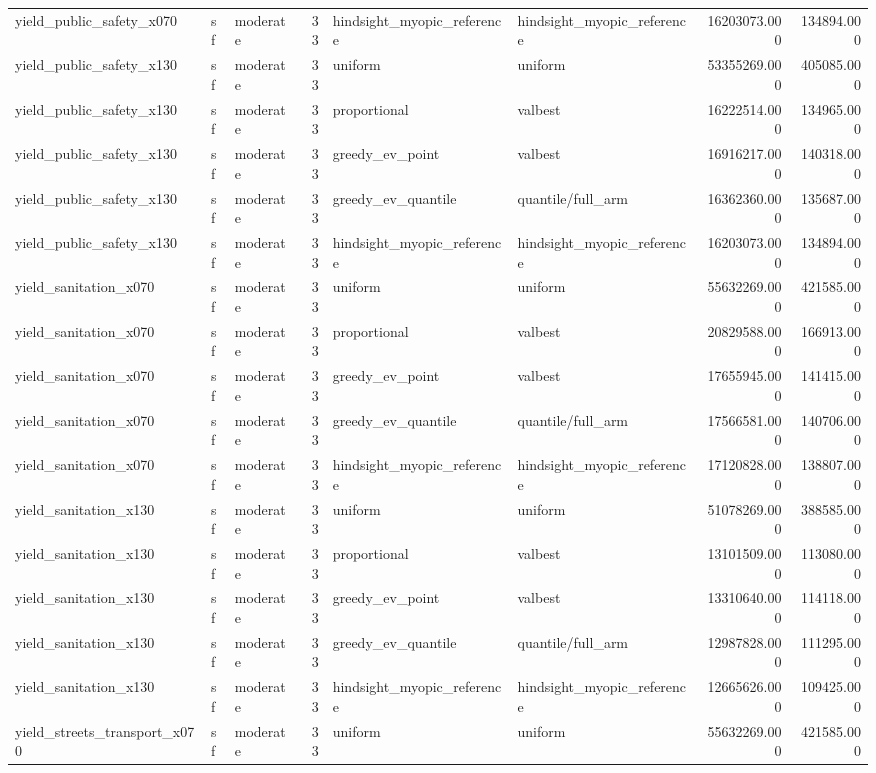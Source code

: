 \begin{tabular}{lllrllrr}
yield\_public\_safety\_x070 & sf & moderate & 33 & hindsight\_myopic\_reference & hindsight\_myopic\_reference & 16203073.000 & 134894.000 \\
yield\_public\_safety\_x130 & sf & moderate & 33 & uniform & uniform & 53355269.000 & 405085.000 \\
yield\_public\_safety\_x130 & sf & moderate & 33 & proportional & valbest & 16222514.000 & 134965.000 \\
yield\_public\_safety\_x130 & sf & moderate & 33 & greedy\_ev\_point & valbest & 16916217.000 & 140318.000 \\
yield\_public\_safety\_x130 & sf & moderate & 33 & greedy\_ev\_quantile & quantile/full\_arm & 16362360.000 & 135687.000 \\
yield\_public\_safety\_x130 & sf & moderate & 33 & hindsight\_myopic\_reference & hindsight\_myopic\_reference & 16203073.000 & 134894.000 \\
yield\_sanitation\_x070 & sf & moderate & 33 & uniform & uniform & 55632269.000 & 421585.000 \\
yield\_sanitation\_x070 & sf & moderate & 33 & proportional & valbest & 20829588.000 & 166913.000 \\
yield\_sanitation\_x070 & sf & moderate & 33 & greedy\_ev\_point & valbest & 17655945.000 & 141415.000 \\
yield\_sanitation\_x070 & sf & moderate & 33 & greedy\_ev\_quantile & quantile/full\_arm & 17566581.000 & 140706.000 \\
yield\_sanitation\_x070 & sf & moderate & 33 & hindsight\_myopic\_reference & hindsight\_myopic\_reference & 17120828.000 & 138807.000 \\
yield\_sanitation\_x130 & sf & moderate & 33 & uniform & uniform & 51078269.000 & 388585.000 \\
yield\_sanitation\_x130 & sf & moderate & 33 & proportional & valbest & 13101509.000 & 113080.000 \\
yield\_sanitation\_x130 & sf & moderate & 33 & greedy\_ev\_point & valbest & 13310640.000 & 114118.000 \\
yield\_sanitation\_x130 & sf & moderate & 33 & greedy\_ev\_quantile & quantile/full\_arm & 12987828.000 & 111295.000 \\
yield\_sanitation\_x130 & sf & moderate & 33 & hindsight\_myopic\_reference & hindsight\_myopic\_reference & 12665626.000 & 109425.000 \\
yield\_streets\_transport\_x070 & sf & moderate & 33 & uniform & uniform & 55632269.000 & 421585.000 \\

\end{tabular}
